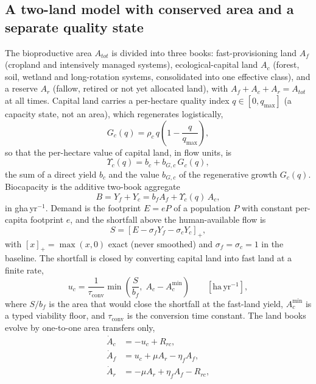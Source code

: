 \documentclass[preprint,12pt,authoryear]{elsarticle}
\newcommand{\pos}[1]{\left[#1\right]_+}
\newcommand{\Ups}{\Upsilon_c}
\newcommand{\Acmin}{A_c^{\min}}
\newcommand{\tconv}{\tau_{\mathrm{conv}}}
\begin{document}
\subsection{A two-land model with conserved area and a separate quality state}\label{sec:equations}

The bioproductive area $A_{tot}$ is divided into three books: fast-provisioning land $A_f$ (cropland and intensively managed systems), ecological-capital land $A_c$ (forest, soil, wetland and long-rotation systems, consolidated into one effective class), and a reserve $A_r$ (fallow, retired or not yet allocated land), with $A_f+A_c+A_r=A_{tot}$ at all times. Capital land carries a per-hectare quality index $q\in[0,q_{\max}]$ (a capacity state, not an area), which regenerates logistically,
\begin{equation}\label{eq:Gc}
G_c(q)=\rho_c\,q\left(1-\frac{q}{q_{\max}}\right),
\end{equation}
so that the per-hectare value of capital land, in flow units, is
\begin{equation}\label{eq:Ups}
\Ups(q)=b_c+b_{G,c}\,G_c(q),
\end{equation}
the sum of a direct yield $b_c$ and the value $b_{G,c}$ of the regenerative growth $G_c(q)$. Biocapacity is the additive two-book aggregate
\begin{equation}\label{eq:B}
B=Y_f+Y_c=b_f A_f+\Ups(q)\,A_c ,
\end{equation}
in gha\,yr$^{-1}$. Demand is the footprint $E=eP$ of a population $P$ with constant per-capita footprint $e$, and the shortfall above the human-available flow is
\begin{equation}\label{eq:S}
S=\pos{E-\sigma_f Y_f-\sigma_c Y_c},
\end{equation}
with $\pos{x}=\max(x,0)$ exact (never smoothed) and $\sigma_f=\sigma_c=1$ in the baseline. The shortfall is closed by converting capital land into fast land at a finite rate,
\begin{equation}\label{eq:uc}
u_c=\frac{1}{\tconv}\min\!\left(\frac{S}{b_f},\;A_c-\Acmin\right)\qquad[\mathrm{ha\,yr^{-1}}],
\end{equation}
where $S/b_f$ is the area that would close the shortfall at the fast-land yield, $\Acmin$ is a typed viability floor, and $\tconv$ is the conversion time constant. The land books evolve by one-to-one area transfers only,
\begin{align}
\dot A_c&=-u_c+R_{rc},\label{eq:Ac}\\
\dot A_f&=u_c+\mu A_r-\eta_f A_f,\label{eq:Af}\\
\dot A_r&=-\mu A_r+\eta_f A_f-R_{rc},\label{eq:Ar}
\end{align}
\end{document}
